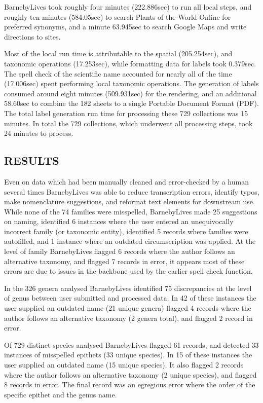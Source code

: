\documentclass[
]{article}
\begin{document}
BarnebyLives took roughly four minutes (222.886sec) to run all local
steps, and roughly ten minutes (584.05sec) to search Plants of the World
Online for preferred synonyms, and a minute 63.945sec to search Google
Maps and write directions to sites.

Most of the local run time is attributable to the spatial (205.254sec),
and taxonomic operations (17.253sec), while formatting data for labels
took 0.379sec. The spell check of the scientific name accounted for
nearly all of the time (17.006sec) spent performing local taxonomic
operations. The generation of labels consumed around eight minutes
(509.931sec) for the rendering, and an additional 58.60sec to combine
the 182 sheets to a single Portable Document Format (PDF). The total
label generation run time for processing these 729 collections was 15
minutes. In total the 729 collections, which underwent all processing
steps, took 24 minutes to process.

\subsection{RESULTS}\label{results}

Even on data which had been manually cleaned and error-checked by a
human several times BarnebyLives was able to reduce transcription
errors, identify typos, make nomenclature suggestions, and reformat text
elements for downstream use. While none of the 74 families were
misspelled, BarnebyLives made 25 suggestions on naming, identified 6
instances where the user entered an unequivocally incorrect family (or
taxonomic entity), identified 5 records where families were autofilled,
and 1 instance where an outdated circumscription was applied. At the
level of family BarnebyLives flagged 6 records where the author follows
an alternative taxonomy, and flagged 7 records in error, it appears most
of these errors are due to issues in the backbone used by the earlier
spell check function.

In the 326 genera analysed BarnebyLives identified 75 discrepancies at
the level of genus between user submitted and processed data. In 42 of
these instances the user supplied an outdated name (21 unique genera)
flagged 4 records where the author follows an alternative taxonomy (2
genera total), and flagged 2 record in error.

Of 729 distinct species analysed BarnebyLives flagged 61 records, and
detected 33 instances of misspelled epithets (33 unique species). In 15
of these instances the user supplied an outdated name (15 unique
species). It also flagged 2 records where the author follows an
alternative taxonomy (2 unique species), and flagged 8 records in error.
The final record was an egregious error where the order of the specific
epithet and the genus name.
\end{document}
